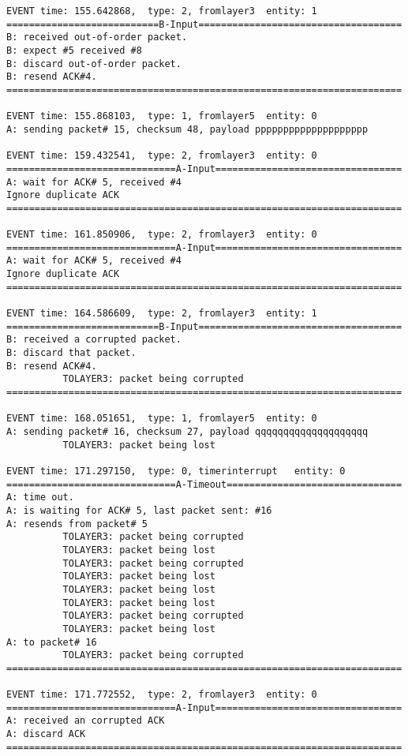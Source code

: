 \documentclass[12pt]{article}
\begin{document}
\begin{verbatim}
EVENT time: 155.642868,  type: 2, fromlayer3  entity: 1
===========================B-Input====================================
B: received out-of-order packet.
B: expect #5 received #8
B: discard out-of-order packet.
B: resend ACK#4.
======================================================================

EVENT time: 155.868103,  type: 1, fromlayer5  entity: 0
A: sending packet# 15, checksum 48, payload pppppppppppppppppppp

EVENT time: 159.432541,  type: 2, fromlayer3  entity: 0
==============================A-Input=================================
A: wait for ACK# 5, received #4
Ignore duplicate ACK
======================================================================

EVENT time: 161.850906,  type: 2, fromlayer3  entity: 0
==============================A-Input=================================
A: wait for ACK# 5, received #4
Ignore duplicate ACK
======================================================================

EVENT time: 164.586609,  type: 2, fromlayer3  entity: 1
===========================B-Input====================================
B: received a corrupted packet.
B: discard that packet.
B: resend ACK#4.
          TOLAYER3: packet being corrupted
======================================================================

EVENT time: 168.051651,  type: 1, fromlayer5  entity: 0
A: sending packet# 16, checksum 27, payload qqqqqqqqqqqqqqqqqqqq
          TOLAYER3: packet being lost

EVENT time: 171.297150,  type: 0, timerinterrupt   entity: 0
==============================A-Timeout===============================
A: time out. 
A: is waiting for ACK# 5, last packet sent: #16
A: resends from packet# 5 
          TOLAYER3: packet being corrupted
          TOLAYER3: packet being lost
          TOLAYER3: packet being corrupted
          TOLAYER3: packet being lost
          TOLAYER3: packet being lost
          TOLAYER3: packet being lost
          TOLAYER3: packet being corrupted
          TOLAYER3: packet being lost
A: to packet# 16
          TOLAYER3: packet being corrupted
======================================================================

EVENT time: 171.772552,  type: 2, fromlayer3  entity: 0
==============================A-Input=================================
A: received an corrupted ACK 
A: discard ACK
======================================================================


\end{verbatim}
\end{document}
